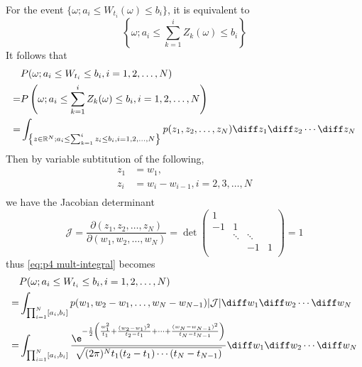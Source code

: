 \begin{subproblem}[\roman*)]
        For the event $\{\omega;a_i\leq W_{t_i}(\omega)\leq b_i\}$,
        it is equivalent to
        \[\left\{\omega;a_i\leq \sum_{k=1}^iZ_k(\omega)\leq b_i\right\}\]
        It follows that
        \begin{equation}
            \label{eq:p4 mult-integral}
            \begin{aligned}
            &P(\omega;a_i\leq W_{t_i}\leq b_i,i=1,2,\ldots,N)\\
            =&P\left(\omega;a_i\leq \sum_{k=1}^iZ_k(\omega)\leq b_i,i=1,2,\ldots,N\right)\\
            =&\int_{\left\{z\in\mathbb R^N;a_i\leq\sum_{k=1}^iz_i\leq b_i,i=1,2,\ldots,N\right\}}
              p(z_1,z_2,\ldots,z_N)
              \diff z_1\diff z_2\cdots\diff z_N
            \end{aligned}
        \end{equation}
        Then by variable subtitution of the following,
        \begin{align*}
            z_1&=w_1,\\
            z_i&=w_i-w_{i-1},i=2,3,\ldots,N\\
        \end{align*}
        we have the Jacobian determinant
        \[\mathcal J=
        \frac{\partial(z_1,z_2,\ldots,z_N)}{\partial(w_1,w_2,\ldots,w_N)}
        =\det\begin{pmatrix}
            1  &        &        &       \\
            -1 & 1      &        &       \\
               & \ddots & \ddots &       \\
               &        & -1     & 1     \\
        \end{pmatrix}=1\]
        thus \cref{eq:p4 mult-integral} becomes
        \begin{align*}
            &P(\omega;a_i\leq W_{t_i}\leq b_i,i=1,2,\ldots,N)\\
            =&\int_{\prod_{i=1}^N[a_i,b_i]}
              p(w_1,w_2-w_1,\ldots,w_N-w_{N-1})
              |\mathcal J|
              \diff w_1\diff w_2\cdots\diff w_N\\
            =&\int_{\prod_{i=1}^N[a_i,b_i]}
               \frac{\e^{-\frac{1}{2}\left(
                   \frac{w_1^2}{t_1} 
                   +\frac{(w_2-w_1)^2}{t_2-t_1}
                   +\cdots
                   +\frac{(w_N-w_{N-1})^2}{t_N-t_{N-1}}
               \right)}}{\sqrt{(2\pi)^Nt_1(t_2-t_1)\cdots(t_N-t_{N-1})}}
              \diff w_1\diff w_2\cdots\diff w_N\\
        \end{align*}


\end{subproblem}
